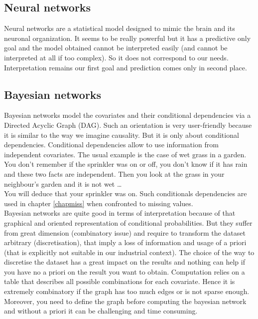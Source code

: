 \documentclass[12pt,a4paper]{report}
\begin{document}
	\subsection{Neural networks}	
		Neural networks \cite{fausett1994fundamentals} are a statistical model designed to mimic the brain and its neuronal organization. It seems to be really powerful but it has a predictive only goal and the model obtained cannot be interpreted easily (and cannot be interpreted at all if too complex). So it does not correspond to our needs. Interpretation remains our first goal and prediction comes only in second place.
		
	\subsection{Bayesian networks}
		
		Bayesian networks \cite{heckerman1995learning,jensen2007bayesian,friedman2000using} model the covariates and their conditional dependencies via a Directed Acyclic Graph (DAG). Such an orientation is very user-friendly because it is similar to the way we imagine causality. But it is only about conditional dependencies. Conditional dependencies allow to use information from independent covariates. The usual example is the case of wet grass in a garden. You don't remember if the sprinkler was on or off, you don't know if it has rain and these two facts are independent. Then you look at the grass in your neighbour's garden and it is not wet \dots \\
		You will deduce that your sprinkler was on. Such conditionals dependencies are used in chapter \ref{chapmiss} when confronted to missing values. \\
		
		Bayesian networks are quite good in terms of interpretation because of that graphical and oriented representation of conditional probabilities. But they suffer from great dimension (combinatory issue) and require to transform the dataset arbitrary (discretisation), that imply a loss of information and usage of a priori (that is explicitly not suitable in our industrial context). The choice of the way to discretise the dataset has a great impact on the results and nothing can help if you have no a priori on the result you want to obtain. Computation relies on a table that describes all possible combinations for each covariate. Hence it is extremely combinatory if the graph has too much edges or is not sparse enough. Moreover, you need to define the graph before computing the bayesian network and without a priori it can be challenging and time consuming.\\
		
\end{document}
